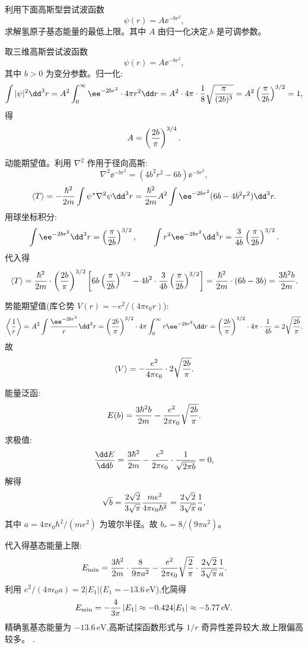 \begin{question}
利用下面高斯型尝试波函数
\[
\psi(r)=A\ee^{-br^2},
\]
求解氢原子基态能量的最低上限。其中 $A$ 由归一化决定,$b$ 是可调参数。
\end{question}
\begin{solution}
取三维高斯尝试波函数
\[
\psi(r)=A \ee^{-b r^2},
\]
其中 $b>0$ 为变分参数。归一化:
\[
\int|\psi|^2\dd^3r=A^2\int_0^\infty \ee^{-2br^2}\cdot4\pi r^2\dd r
=A^2\cdot4\pi\cdot{1\over8}\sqrt{\pi\over(2b)^3}
=A^2\left({\pi\over2b}\right)^{3/2}=1,
\]
得
\[
A=\left({2b\over\pi}\right)^{3/4}.
\]

动能期望值。利用 $\nabla^2$ 作用于径向高斯:
\[
\nabla^2 \ee^{-br^2}=\left(4b^2r^2-6b\right)\ee^{-br^2},
\]
\[
\langle T\rangle=-{\hbar^2\over2m}\int\psi^*\nabla^2\psi\dd^3r
={\hbar^2\over2m}A^2\int \ee^{-2br^2}(6b-4b^2r^2)\dd^3r.
\]
用球坐标积分:
\[
\int \ee^{-2br^2}\dd^3r=\left({\pi\over2b}\right)^{3/2},\qquad
\int r^2 \ee^{-2br^2}\dd^3r={3\over4b}\left({\pi\over2b}\right)^{3/2}.
\]
代入得
\[
\langle T\rangle={\hbar^2\over2m}\cdot\left({2b\over\pi}\right)^{3/2}
\left[6b\left({\pi\over2b}\right)^{3/2}-4b^2\cdot{3\over4b}\left({\pi\over2b}\right)^{3/2}\right]
={\hbar^2\over2m}\cdot(6b-3b)={3\hbar^2b\over2m}.
\]

势能期望值(库仑势 $V(r)=-e^2/(4\pi\epsilon_0 r)$):
\[
\left\langle{1\over r}\right\rangle=A^2\int{\ee^{-2br^2}\over r}\dd^3r
=\left({2b\over\pi}\right)^{3/2}\cdot4\pi\int_0^\infty r \ee^{-2br^2}\dd r
=\left({2b\over\pi}\right)^{3/2}\cdot4\pi\cdot{1\over4b}
=2\sqrt{2b\over\pi}.
\]
故
\[
\langle V\rangle=-{e^2\over4\pi\epsilon_0}\cdot2\sqrt{2b\over\pi}.
\]

能量泛函:
\[
E(b)={3\hbar^2b\over2m}-{e^2\over2\pi\epsilon_0}\sqrt{2b\over\pi}.
\]

求极值:
\[
{\dd E\over\dd b}={3\hbar^2\over2m}-{e^2\over2\pi\epsilon_0}\cdot{1\over\sqrt{2\pi b}}=0,
\]
解得
\[
\sqrt b={2\sqrt2\over3\sqrt\pi}{me^2\over4\pi\epsilon_0\hbar^2}={2\sqrt2\over3\sqrt\pi}{1\over a},
\]
其中 $a=4\pi\epsilon_0\hbar^2/(me^2)$ 为玻尔半径。故 $b_*=8/(9\pi a^2)$。

代入得基态能量上限:
\[
E_{\min}={3\hbar^2\over2m}\cdot{8\over9\pi a^2}-{e^2\over2\pi\epsilon_0}\sqrt{2\over\pi}\cdot{2\sqrt2\over3\sqrt\pi}{1\over a}.
\]
利用 $e^2/(4\pi\epsilon_0 a)=2|E_1|$($E_1=-13.6\,\mathrm{eV}$),化简得
\[
E_{\min}=-{4\over3\pi}\,|E_1|\approx-0.424|E_1|\approx-5.77\,\mathrm{eV}.
\]
精确氢基态能量为 $-13.6\,\mathrm{eV}$,高斯试探函数形式与 $1/r$ 奇异性差异较大,故上限偏高较多。
.
\end{solution}

